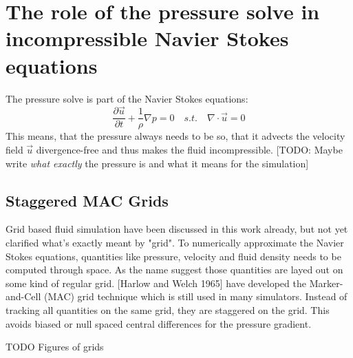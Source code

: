 \section{The role of the pressure solve in incompressible Navier Stokes equations}
The pressure solve is part of the Navier Stokes equations:
\begin{equation} \label{navier-stokes-pressure}
	\frac{\partial \vec{u}}{\partial t} + \frac{1}{\rho}  \nabla p = 0 \quad s.t. \quad \nabla \cdot \vec{u} = 0
\end{equation}
This means, that the pressure always needs to be so, that it advects the velocity field $\vec{u}$ divergence-free and thus makes the fluid incompressible.  [TODO: Maybe write \textit{what exactly} the pressure is and what it means for the simulation]

\subsection{Staggered MAC Grids}
Grid based fluid simulation have been discussed in this work already, but not yet clarified what's exactly meant by "grid". To numerically approximate the Navier Stokes equations, quantities like pressure, velocity and fluid density needs to be computed through space. As the name suggest those quantities are layed out on some kind of regular grid. [Harlow and Welch 1965] have developed the Marker-and-Cell (MAC) grid technique which is still used in many simulators. Instead of tracking all quantities on the same grid, they are staggered on the grid. This avoids biased or null spaced central differences for the pressure gradient. 
\par TODO Figures of grids 

